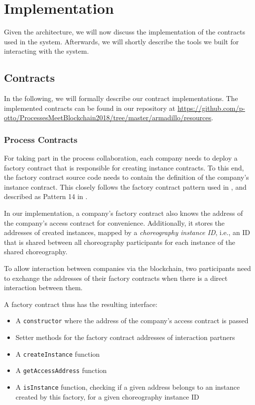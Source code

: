 \documentclass[runningheads]{llncs}
\begin{document}
\section{Implementation}

Given the architecture, we will now discuss the implementation of the contracts used in the system.
Afterwards, we will shortly describe the tools we built for interacting with the system.

\subsection{Contracts}

In the following, we will formally describe our contract implementations.
The implemented contracts can be found in our repository at \url{https://github.com/p-otto/ProcessesMeetBlockchain2018/tree/master/armadillo/resources}.

\subsubsection{Process Contracts}

For taking part in the process collaboration, each company needs to deploy a factory contract that is responsible for creating instance contracts.
To this end, the factory contract source code needs to contain the definition of the company's instance contract.
This closely follows the factory contract pattern used in \cite{weber2016untrusted}, and described as Pattern 14 in \cite{xu2018pattern}.

In our implementation, a company's factory contract also knows the address of the company's access contract for convenience.
Additionally, it stores the addresses of created instances, mapped by a \textit{choreography instance ID}, i.e., an ID that is shared between all choreography participants for each instance of the shared choreography.

To allow interaction between companies via the blockchain, two participants need to exchange the addresses of their factory contracts when there is a direct interaction between them.

A factory contract thus has the resulting interface:
\begin{itemize}
	\item A \texttt{constructor} where the address of the company's access contract is passed
	\item Setter methods for the factory contract addresses of interaction partners
	\item A \texttt{createInstance} function
	\item A \texttt{getAccessAddress} function
	\item A \texttt{isInstance} function, checking if a given address belongs to an instance created by this factory, for a given choreography instance ID %
\end{itemize}
\end{document}
